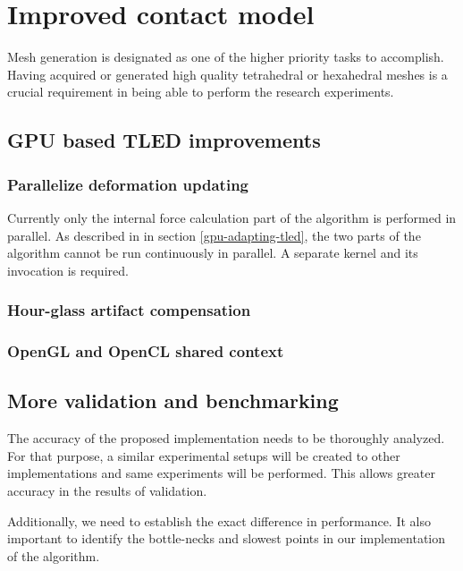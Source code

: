 \section{Improved contact model}\label{future-meshgen}

Mesh generation is designated as one of the higher priority tasks to accomplish. Having acquired or generated high quality tetrahedral or hexahedral meshes is a crucial requirement in being able to perform the research experiments.

\subsection{GPU based TLED improvements}

\subsubsection{Parallelize deformation updating}

Currently only the internal force calculation part of the algorithm is performed in parallel. As described in in section \ref{gpu-adapting-tled}, the two parts of the algorithm cannot be run continuously in parallel. A separate kernel and its invocation is required.

\subsubsection{Hour-glass artifact compensation}



\subsubsection{OpenGL and OpenCL shared context}

\subsection{More validation and benchmarking}

The accuracy of the proposed implementation needs to be thoroughly analyzed. For that purpose, a similar experimental setups will be created to other implementations and same experiments will be performed. This allows greater accuracy in the results of validation.

Additionally, we need to establish the exact difference in performance. It also important to identify the bottle-necks and slowest points in our implementation of the algorithm.
